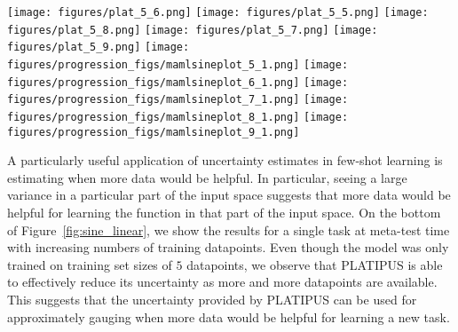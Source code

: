 \documentclass{article}
\begin{document}
\begin{figure*}[t] \centering
\texttt{[image: figures/plat\_5\_6.png]}
    \texttt{[image: figures/plat\_5\_5.png]}
    \texttt{[image: figures/plat\_5\_8.png]}
    \texttt{[image: figures/plat\_5\_7.png]}
    \texttt{[image: figures/plat\_5\_9.png]}
    \texttt{[image: figures/progression\_figs/mamlsineplot\_5\_1.png]}
    \texttt{[image: figures/progression\_figs/mamlsineplot\_6\_1.png]}
    \texttt{[image: figures/progression\_figs/mamlsineplot\_7\_1.png]}
    \texttt{[image: figures/progression\_figs/mamlsineplot\_8\_1.png]}
    \texttt{[image: figures/progression\_figs/mamlsineplot\_9\_1.png]}
    \vspace{-0.2cm}
    \caption{\small Samples from PLATIPUS trained for 5-shot regression, shown as colored dotted lines. The tasks consist of regressing to sinusoid and linear functions, shown in gray. MAML, shown in black, is a deterministic procedure and hence learns a single function, rather than reasoning about the distribution over potential functions. As seen on the bottom row, even though PLATIPUS is trained for 5-shot regression, it can effectively reason over its uncertainty when provided variable numbers of datapoints at test time (left vs. right).
    \label{fig:sine_linear} }
    \vspace{-0.4cm}
\end{figure*}

A particularly useful application of uncertainty estimates in few-shot learning is estimating when more data would be helpful. In particular, seeing a large variance in a particular part of the input space suggests that more data would be helpful for learning the function in that part of the input space. On the bottom of Figure~\ref{fig:sine_linear}, we show the results for a single task at meta-test time with increasing numbers of training datapoints. Even though the model was only trained on training set sizes of $5$ datapoints, we observe that PLATIPUS is able to effectively reduce its uncertainty as more and more datapoints are available. This suggests that the uncertainty provided by PLATIPUS can be used for approximately gauging when more data would be helpful for learning a new task. 
\end{document}
